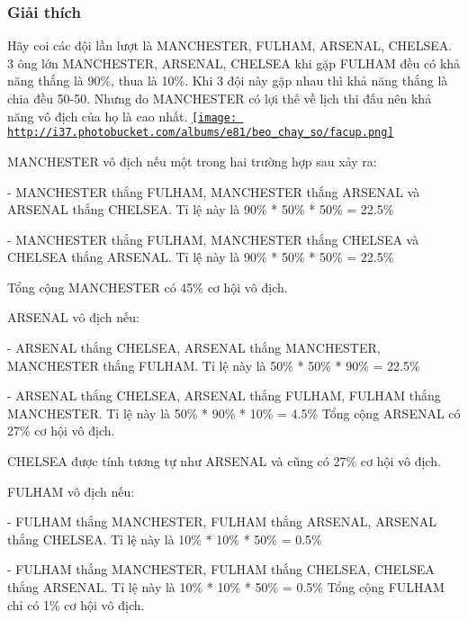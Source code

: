 \subsubsection{   Giải thích  }

   Hãy coi các đội lần lượt là MANCHESTER, FULHAM, ARSENAL, CHELSEA. 3 ông lớn MANCHESTER, ARSENAL, CHELSEA khi gặp FULHAM đều có khả năng thắng là 90\%, thua là 10\%. Khi 3 đội này gặp nhau thì khả năng thắng là chia đều 50-50. Nhưng do MANCHESTER có lợi thế về lịch thi đấu nên khả năng vô địch của họ là cao nhất.  \href{http://s37.photobucket.com/albums/e81/beo_chay_so/?action=view¤t=facup.png}{
\texttt{[image: http://i37.photobucket.com/albums/e81/beo\_chay\_so/facup.png]}}

   MANCHESTER vô địch nếu một trong hai trường hợp sau xảy ra:  

   - MANCHESTER thắng FULHAM, MANCHESTER thắng ARSENAL và ARSENAL thắng CHELSEA. Tỉ lệ này là 90\% * 50\% * 50\% = 22.5\%  

   - MANCHESTER thắng FULHAM, MANCHESTER thắng CHELSEA và CHELSEA thắng ARSENAL. Tỉ lệ này là 90\% * 50\% * 50\% = 22.5\%  

   Tổng cộng MANCHESTER có 45\% cơ hội vô địch.  

   ARSENAL vô địch nếu:  

   - ARSENAL thắng CHELSEA, ARSENAL thắng MANCHESTER, MANCHESTER thắng FULHAM. Tỉ lệ này là 50\% * 50\% * 90\% = 22.5\%  

   - ARSENAL thắng CHELSEA, ARSENAL thắng FULHAM, FULHAM thắng MANCHESTER. Tỉ lệ này là 50\% * 90\% * 10\% = 4.5\% Tổng cộng ARSENAL có 27\% cơ hội vô địch.  

   CHELSEA được tính tương tự như ARSENAL và cũng có 27\% cơ hội vô địch.  

   FULHAM vô địch nếu:  

   - FULHAM thắng MANCHESTER, FULHAM thắng ARSENAL, ARSENAL thắng CHELSEA. Tỉ lệ này là 10\% * 10\% * 50\% = 0.5\%  

   - FULHAM thắng MANCHESTER, FULHAM thắng CHELSEA, CHELSEA thắng ARSENAL. Tỉ lệ này là 10\% * 10\% * 50\% = 0.5\% Tổng cộng FULHAM chỉ có 1\% cơ hội vô địch.  
